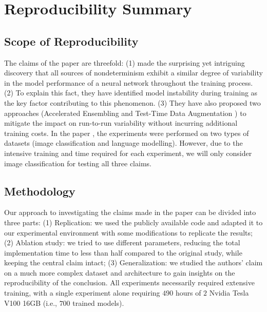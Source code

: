 \section*{\centering Reproducibility Summary}
\subsection*{Scope of Reproducibility}
The claims of the paper \cite{summers2021nondeterminism} are threefold: (1) \cite{summers2021nondeterminism} made the surprising yet intriguing discovery that all sources of nondeterminism exhibit a similar degree of variability in the model performance of a neural network throughout the training process. (2) To explain this fact, they have identified model instability during training as the key factor contributing to this phenomenon. (3) They have also proposed two approaches (Accelerated Ensembling \cite{wen2020batchensemble} and Test-Time Data Augmentation \cite{szegedy2015going}) to mitigate the impact on run-to-run variability without incurring additional training costs. In the paper \cite{summers2021nondeterminism}, the experiments were performed on two types of datasets (image classification and language modelling). However, due to the intensive training and time required for each experiment, we will only consider image classification for testing all three claims.
 

\subsection*{Methodology}

Our approach to investigating the claims made in the paper \cite{summers2021nondeterminism} can be divided into three parts: (1) Replication: we used the publicly available code and adapted it to our experimental environment with some modifications to replicate the results; (2) Ablation study: we tried to use different parameters, reducing the total implementation time to less than half compared to the original study, while keeping the central claim intact; (3) Generalization: we studied the authors' claim on a much more complex dataset and architecture to gain insights on the reproducibility of the conclusion. 
All experiments necessarily required extensive training, with a single experiment alone requiring $490$ hours of $2$ Nvidia Tesla V100 16GB (i.e., $700$ trained models).


